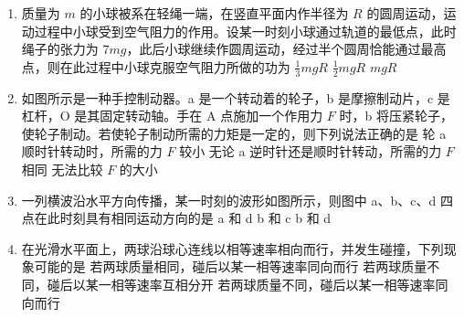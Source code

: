 \documentclass[\gkver]{gaokaozhenti}
\begin{document}
\begin{enumerate}

\item
质量为 $m$ 的小球被系在轻绳一端，在竖直平面内作半径为 $R$ 的圆周运动，运动过程中小球受到空气阻力的作用。设某一时刻小球通过轨道的最低点，此时绳子的张力为 $7mg$，此后小球继续作圆周运动，经过半个圆周恰能通过最高点，则在此过程中小球克服空气阻力所做的功为
{$\frac{1}{3}mgR$}
{$\frac{1}{2}mgR$}
{$mgR$}


\item
如图所示是一种手控制动器。a 是一个转动着的轮子，b 是摩擦制动片，c 是杠杆，O 是其固定转动轴。手在 A 点施加一个作用力 $F$ 时，b 将压紧轮子，使轮子制动。若使轮子制动所需的力矩是一定的，则下列说法正确的是
\onepicture[h=4.5cm]{}
{轮 a 顺时针转动时，所需的力 $F$ 较小}
{无论 a 逆时针还是顺时针转动，所需的力 $F$ 相同}
{无法比较 $F$ 的大小}


\item
一列横波沿水平方向传播，某一时刻的波形如图所示，则图中 a、b、c、d 四点在此时刻具有相同运动方向的是
\onepicture[w=6cm]{}
{a 和 d}
{b 和 c}
{b 和 d}


\item
在光滑水平面上，两球沿球心连线以相等速率相向而行，并发生碰撞，下列现象可能的是
{若两球质量相同，碰后以某一相等速率同向而行}
{若两球质量不同，碰后以某一相等速率互相分开}
{若两球质量不同，碰后以某一相等速率同向而行}


\end{enumerate}
\end{document}
